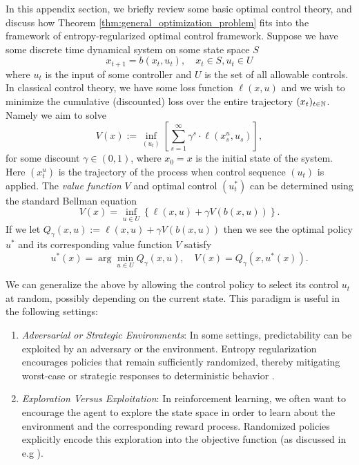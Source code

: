 \begin{subappendices}
In this appendix section, we briefly review some basic optimal control theory, and discuss how Theorem \ref{thm:general_optimization_problem} fits into the framework of
 entropy-regularized optimal control framework. Suppose we have some discrete time 
 dynamical system on some state space $S$
\[x_{t+1} = b(x_t, u_t), \quad x_t \in S, u_t \in U\]
%
\noindent where $u_t$ is the input of some controller and $U$ is the set of all allowable controls. In classical control
theory, we have some loss function $\ell(x,u)$ and we wish to minimize the cumulative (discounted) loss over the entire
trajectory $(x_t)_{t \in \mathbb{N}}$. Namely we aim to solve
%
\[V(x) := \inf_{(u_t)} \left[\sum_{s=1}^\infty \gamma^s \cdot \ell(x^u_s, u_s) \right],\]
%
\noindent for some discount $\gamma \in (0,1)$, where $x_0 = x$ is the initial state of the system. Here $(x^u_t)$ is the trajectory of the process when control sequence
$(u_t)$ is applied. The \textit{value function} $V$ and optimal control $(u^*_t)$ can be determined
using the standard Bellman equation
%
\[V(x) = \inf_{u \in U} \left\{\ell(x,u) + \gamma V( b(x,u))\right\}.\]
%
\noindent If we let $Q_\gamma(x,u) := \ell(x, u) + \gamma V(b(x,u))$ then we see the optimal policy $u^*$ and its
corresponding value function $V$ satisfy
%
\begin{equation}
	u^*(x) = \arg\min_{u \in U} Q_\gamma(x, u), \quad V(x) = Q_\gamma(x, u^*(x)).
	\label{eqn:optimal_unregularized_policy}
\end{equation}

%
We can generalize the above by allowing the control policy to select its control $u_t$ at random, possibly depending on the current state. This paradigm is useful in the following settings:

\begin{enumerate}[label=(\roman*)]

    \item \textit{Adversarial or Strategic Environments}: In some settings, predictability can be exploited by an adversary or the environment. Entropy regularization encourages policies that remain sufficiently randomized, thereby mitigating worst-case or strategic responses to deterministic behavior \cite{husain2021_regularized_policies_reward_robust}.

    \item \textit{Exploration Versus Exploitation}: In reinforcement learning, we often want to encourage the agent to explore the state space in order to learn about the environment and the corresponding reward process. Randomized policies explicitly encode this exploration into the objective function (as discussed in e.g \cite{wang2020_reinforcement_learning_stochastic_control}).


\end{enumerate}
\end{subappendices}
